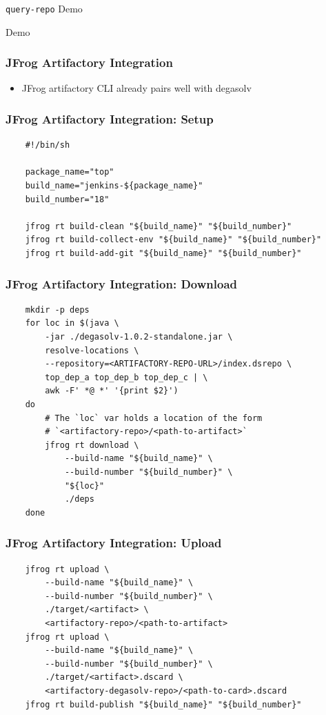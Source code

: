\documentclass{beamer}
\begin{document}
\begin{frame}
  \centerline{\color{blue}\Large \texttt{query-repo} Demo}
\end{frame}
\begin{frame}
  \centerline{\color{blue}\Large Demo}
\end{frame}
\begin{frame}[fragile]
  \frametitle{JFrog Artifactory Integration}
  \begin{itemize}
  \item JFrog artifactory CLI already pairs well with degasolv
  \end{itemize}
\end{frame}
\begin{frame}[fragile]
\frametitle{JFrog Artifactory Integration: Setup}
\begin{verbatim}
    #!/bin/sh

    package_name="top"
    build_name="jenkins-${package_name}"
    build_number="18"

    jfrog rt build-clean "${build_name}" "${build_number}"
    jfrog rt build-collect-env "${build_name}" "${build_number}"
    jfrog rt build-add-git "${build_name}" "${build_number}"
\end{verbatim}
\end{frame}
\begin{frame}[fragile]
\frametitle{JFrog Artifactory Integration: Download}
\begin{verbatim}
    mkdir -p deps
    for loc in $(java \
        -jar ./degasolv-1.0.2-standalone.jar \
        resolve-locations \
        --repository=<ARTIFACTORY-REPO-URL>/index.dsrepo \
        top_dep_a top_dep_b top_dep_c | \
        awk -F' *@ *' '{print $2}')
    do
        # The `loc` var holds a location of the form
        # `<artifactory-repo>/<path-to-artifact>`
        jfrog rt download \
            --build-name "${build_name}" \
            --build-number "${build_number}" \
            "${loc}"
            ./deps
    done
\end{verbatim}
\end{frame}
\begin{frame}[fragile]
\frametitle{JFrog Artifactory Integration: Upload}
\begin{verbatim}
    jfrog rt upload \
        --build-name "${build_name}" \
        --build-number "${build_number}" \
        ./target/<artifact> \
        <artifactory-repo>/<path-to-artifact>
    jfrog rt upload \
        --build-name "${build_name}" \
        --build-number "${build_number}" \
        ./target/<artifact>.dscard \
        <artifactory-degasolv-repo>/<path-to-card>.dscard
    jfrog rt build-publish "${build_name}" "${build_number}"
\end{verbatim}
\end{frame}
\end{document}
